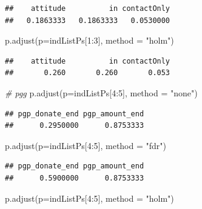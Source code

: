 \documentclass[
]{article}
\newenvironment{Shaded}{\begin{snugshade}}{\end{snugshade}}
\newcommand{\AttributeTok}[1]{\textcolor[rgb]{0.77,0.63,0.00}{#1}}
\newcommand{\CommentTok}[1]{\textcolor[rgb]{0.56,0.35,0.01}{\textit{#1}}}
\newcommand{\DecValTok}[1]{\textcolor[rgb]{0.00,0.00,0.81}{#1}}
\newcommand{\FunctionTok}[1]{\textcolor[rgb]{0.00,0.00,0.00}{#1}}
\newcommand{\NormalTok}[1]{#1}
\newcommand{\SpecialCharTok}[1]{\textcolor[rgb]{0.00,0.00,0.00}{#1}}
\newcommand{\StringTok}[1]{\textcolor[rgb]{0.31,0.60,0.02}{#1}}
\begin{document}
\begin{verbatim}
##    attitude          in contactOnly 
##   0.1863333   0.1863333   0.0530000
\end{verbatim}

\begin{Shaded}
\begin{Highlighting}[]
\FunctionTok{p.adjust}\NormalTok{(}\AttributeTok{p=}\NormalTok{indListPs[}\DecValTok{1}\SpecialCharTok{:}\DecValTok{3}\NormalTok{], }\AttributeTok{method =} \StringTok{"holm"}\NormalTok{)}
\end{Highlighting}
\end{Shaded}

\begin{verbatim}
##    attitude          in contactOnly 
##       0.260       0.260       0.053
\end{verbatim}

\begin{Shaded}
\begin{Highlighting}[]
\CommentTok{\# pgg}
\FunctionTok{p.adjust}\NormalTok{(}\AttributeTok{p=}\NormalTok{indListPs[}\DecValTok{4}\SpecialCharTok{:}\DecValTok{5}\NormalTok{], }\AttributeTok{method =} \StringTok{"none"}\NormalTok{)}
\end{Highlighting}
\end{Shaded}

\begin{verbatim}
## pgp_donate_end pgp_amount_end 
##      0.2950000      0.8753333
\end{verbatim}

\begin{Shaded}
\begin{Highlighting}[]
\FunctionTok{p.adjust}\NormalTok{(}\AttributeTok{p=}\NormalTok{indListPs[}\DecValTok{4}\SpecialCharTok{:}\DecValTok{5}\NormalTok{], }\AttributeTok{method =} \StringTok{"fdr"}\NormalTok{)}
\end{Highlighting}
\end{Shaded}

\begin{verbatim}
## pgp_donate_end pgp_amount_end 
##      0.5900000      0.8753333
\end{verbatim}

\begin{Shaded}
\begin{Highlighting}[]
\FunctionTok{p.adjust}\NormalTok{(}\AttributeTok{p=}\NormalTok{indListPs[}\DecValTok{4}\SpecialCharTok{:}\DecValTok{5}\NormalTok{], }\AttributeTok{method =} \StringTok{"holm"}\NormalTok{)}
\end{Highlighting}
\end{Shaded}
\end{document}
